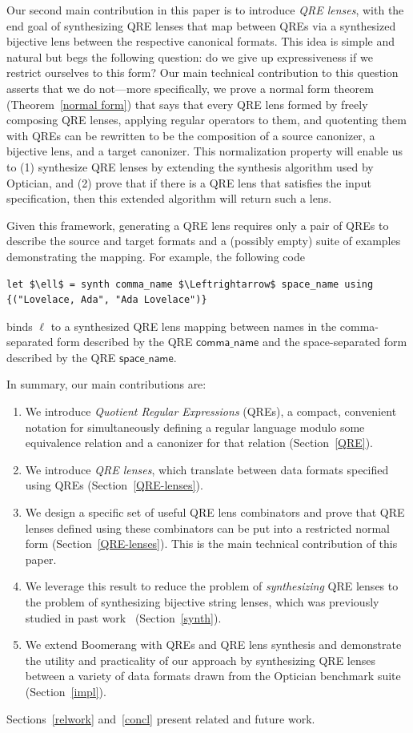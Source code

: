 \documentclass[acmsmall,screen]{acmart}
\newcommand{\codefont}[1]{\ensuremath{\mathsf{#1}}}
\begin{document}
Our second main contribution in this paper is to introduce {\em QRE lenses},
with the end goal of synthesizing QRE lenses that map between QREs via a
synthesized bijective lens between the respective canonical formats. This idea
is simple and natural but begs the following question: do we give up
expressiveness if we restrict ourselves to this form? Our main technical
contribution to this question asserts that we do not---more specifically, we
prove a normal form theorem (Theorem~\ref{normal form}) that says that every
QRE lens formed by freely composing QRE lenses, applying regular
operators to them, and quotenting them with QREs can be rewritten to be the
composition of a source canonizer, a bijective lens, and a target canonizer.
This normalization property will enable us to (1) synthesize QRE lenses by
extending the synthesis algorithm used by Optician, and (2) prove that if there
is a QRE lens that satisfies the input specification, then this extended
algorithm will return such a lens.

Given this framework, generating a QRE lens requires only a pair of QREs to
describe the source and target formats and a (possibly empty) suite of examples
demonstrating the mapping.  For example, the following code

\begin{lstlisting}
let $\ell$ = synth comma_name $\Leftrightarrow$ space_name using {("Lovelace, Ada", "Ada Lovelace")}
\end{lstlisting}
binds $\ell$ to a synthesized QRE lens mapping between names in the
comma-separated form described by the QRE \codefont{comma\_name} and the
space-separated form described by the QRE \codefont{space\_name}. 

In summary, our main contributions are:
\begin{enumerate}
  \item We introduce {\em Quotient Regular Expressions} (QREs), 
  a compact, convenient notation for simultaneously defining a
  regular language modulo some equivalence relation and a canonizer
  for that relation (Section~\ref{QRE}).
  \item We introduce {\em QRE lenses}, which translate between data formats
  specified using QREs (Section~\ref{QRE-lenses}).
  \item We design a specific set of useful QRE lens combinators and prove
  that QRE lenses defined using these combinators can be put into a
  restricted normal form (Section~\ref{QRE-lenses}).  This is
  the main technical contribution of this paper.
  \item We leverage this result to reduce the problem of {\em synthesizing}
  QRE lenses to the problem of synthesizing bijective string lenses, which was
  previously studied in past work~\cite{optician} (Section~\ref{synth}).
  \item We extend Boomerang with QREs and QRE lens synthesis and demonstrate
  the utility and practicality of our approach by synthesizing QRE lenses
  between a variety of data formats drawn from the Optician benchmark suite
  (Section~\ref{impl}).
\end{enumerate}
Sections~\ref{relwork} and~\ref{concl} present related and future work.
\end{document}
